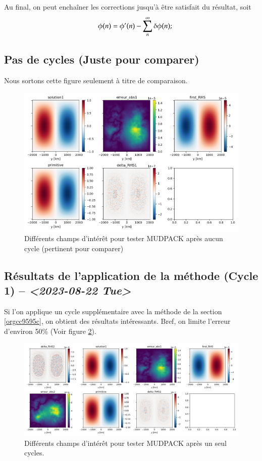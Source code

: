 \documentclass[10pt]{article}
\numberwithin{equation}{section}
\begin{document}
Au final, on peut enchaîner les corrections jusqu'à être satisfait du résultat, soit
\begin{align}
   &\hspace{4mm}\phi(n) = \phi'(n) - \sum_n^\infty \delta\phi(n); \\
\end{align}

\subsection{Pas de cycles (Juste pour comparer)}
\label{sec:orga3d75ac}

Nous sortons cette figure seulement à titre de comparaison.

\begin{figure}[htbp]
\centering
\includegraphics[width=.9\linewidth]{figures/MUDPACK/2023-08-23_MUDPACK_test_dirichlet0.png}
\caption{\label{fig:org13d2e2d}Différents champs d'intérêt pour tester MUDPACK après aucun cycle (pertinent pour comparer)}
\end{figure}


\subsection{Résultats de l'application de la méthode (Cycle 1) -- \textit{<2023-08-22 Tue>}}
\label{sec:org85949fa}
Si l'on applique un cycle supplémentaire avec la méthode de la section \ref{orgcc9595c}, on obtient des résultats intéressants.
Bref, on limite l'erreur d'environ 50\% (Voir figure \ref{fig:org3bcf07a}).

\begin{figure}[htbp]
\centering
\includegraphics[width=.9\linewidth]{figures/MUDPACK/2023-08-23_MUDPACK_test_dirichlet2.png}
\caption{\label{fig:org3bcf07a}Différents champs d'intérêt pour tester MUDPACK après un seul cycles.}
\end{figure}
\end{document}
